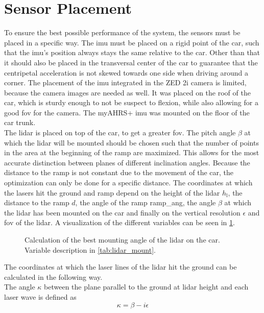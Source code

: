 \section{Sensor Placement}
To ensure the best possible performance of the system, the sensors must be placed in a specific way.
The \gls{imu} must be placed on a rigid point of the car, such that the \gls{imu}'s position always stays the same relative to the car.
Other than that it should also be placed in the transversal center of the car to guarantee that the centripetal acceleration is not skewed towards one side when driving around a corner.
The placement of the \gls{imu} integrated in the ZED 2i camera is limited, because the camera images are needed as well.
It was placed on the roof of the car, which is sturdy enough to not be suspect to flexion, while also allowing for a good \gls{fov} for the camera.
The myAHRS+ \gls{imu} was mounted on the floor of the car trunk.\\
The \gls{lidar} is placed on top of the car, to get a greater \gls{fov}.
The pitch angle $\beta$ at which the \gls{lidar} will be mounted should be chosen such that the number of points in the area at the beginning of the ramp are maximized.
This allows for the most accurate distinction between planes of different inclination angles.
Because the distance to the ramp is not constant due to the movement of the car, the optimization can only be done for a specific distance.
The coordinates at which the lasers hit the ground and ramp depend on the height of the \gls{lidar} $h_\mathrm{l}$, the distance to the ramp $d$, the angle of the ramp \gls{ramp_ang}, the angle $\beta$ at which the \gls{lidar} has been mounted on the car and finally on the vertical resolution $\epsilon$ and \gls{fov} of the \gls{lidar}.
A visualization of the different variables can be seen in \cref{fig:tikz_lidar_mount}.
\begin{figure}[htb]
    \centering
    
    \caption[\acrshort{lidar} placement on the car]{Calculation of the best mounting angle of the \acrshort{lidar} on the car. Variable description in \cref{tab:lidar_mount}.}
    \label{fig:tikz_lidar_mount}
\end{figure}
The coordinates at which the laser lines of the \gls{lidar} hit the ground can be calculated in the following way.\\
The angle $\kappa$ between the plane parallel to the ground at \gls{lidar} height and each laser wave is defined as
\begin{equation}
    \kappa = \beta - i\epsilon
\end{equation}
